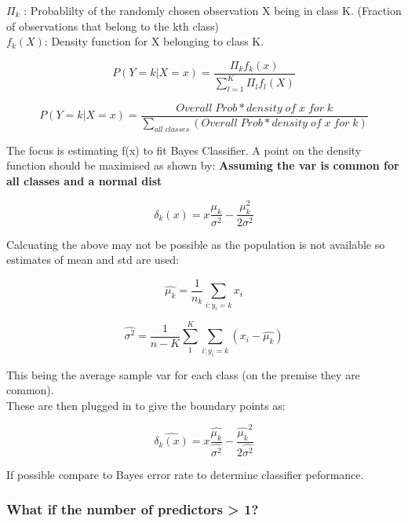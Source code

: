 \documentclass[11pt]{scrartcl} %
\begin{document}
\(\Pi_k\) : Probablilty of the randomly chosen observation X being in class K. (Fraction of observations that belong to the kth class)\\

\(f_k(X)\): Density function for X belonging to class K.

\begin{equation}
	P(Y=k|X=x) = \frac{\Pi_kf_k(x)}{\sum^K_{l=1}{\Pi_lf_l(X)}}
\end{equation}

\begin{equation}
	P(Y=k|X=x) = \frac{Overall\; Prob * density\; of \; x \; for \; k}{\sum_{all\; classes}(Overall\; Prob * density\; of \; x \; for \; k)}
\end{equation}

The focus is estimating f(x) to fit Bayes Classifier. A point on the density function should be maximised as shown by:
\textbf{Assuming the var is common for all classes and a normal dist}

\begin{equation}
	\delta_k(x) = x\frac{\mu_k}{\sigma^2} - \frac{\mu_k^2}{2\sigma^2}
\end{equation}

Calcuating the above may not be possible as the population is not available so estimates of mean and std are used:

\begin{equation}
	\hat{\mu_k} = \frac{1}{n_k}\sum_{i:y_i=k}{x_i}
\end{equation}


\begin{equation}
	\hat{\sigma^2}  = \frac{1}{n-K}\sum^K_1\sum_{i:y_i=k}(x_i - \hat{\mu_k})
\end{equation}

This being the average sample var for each class (on the premise they are common).\\

These are then plugged in to give the boundary points as:

\begin{equation}
	\hat{\delta_k(x)} = x\frac{\hat{\mu_k}}{\hat{\sigma^2}} - \frac{\hat{\mu_k}^2}{2\hat{\sigma^2}}
\end{equation}

If possible compare to Bayes error rate to determine classifier peformance.

\subsubsection{What if the number of predictors > 1?}
\end{document}
